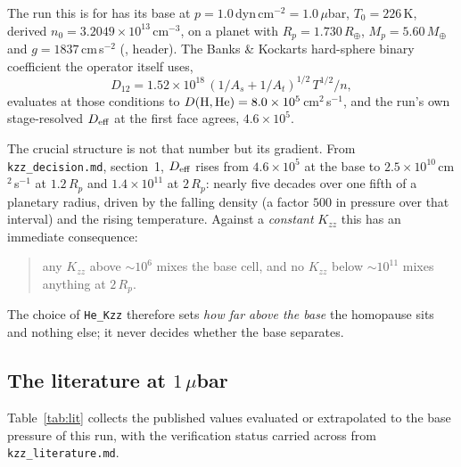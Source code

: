 \documentclass[english,a4paper]{my_memo}
\begin{document}
The run this is for has its base at $p = 1.0$\,dyn\,cm$^{-2}
= 1.0\,\mu$bar, $T_0 = 226$\,K, derived $n_0 = 3.2049\times10^{13}$\,cm$^{-3}$,
on a planet with $R_p = 1.730\,R_\oplus$, $M_p = 5.60\,M_\oplus$ and
$g = 1837$\,cm\,s$^{-2}$ (, header).
The Banks \& Kockarts hard-sphere binary coefficient the operator itself
uses,
%
\begin{equation}
  D_{12} = 1.52\times10^{18}\,(1/A_s + 1/A_t)^{1/2}\,T^{1/2}/n ,
\end{equation}
%
evaluates at those conditions to $D({\rm H,He}) =
8.0\times10^{5}$\,cm$^{2}$\,s$^{-1}$, and the run's own stage-resolved
$D_{\rm eff}$ at the first face agrees, $4.6\times10^{5}$.

The crucial structure is not that number but its gradient. From
\texttt{kzz\_decision.md}, section~1, $D_{\rm eff}$ rises from
$4.6\times10^{5}$ at the base to $2.5\times10^{10}$\,cm$^{2}$\,s$^{-1}$ at
$1.2\,R_p$ and $1.4\times10^{11}$ at $2\,R_p$: nearly five decades over
one fifth of a planetary radius, driven by the falling density (a factor
$500$ in pressure over that interval) and the rising temperature. Against a
\emph{constant} $K_{zz}$ this has an immediate consequence:
%
\begin{quote}
any $K_{zz}$ above $\sim 10^{6}$ mixes the base cell, and no $K_{zz}$ below
$\sim 10^{11}$ mixes anything at $2\,R_p$.
\end{quote}
%
The choice of \texttt{He\_Kzz} therefore sets \emph{how far above the base}
the homopause sits and nothing else; it never decides whether the base
separates.

\subsection{The literature at $1\,\mu$bar}

Table~\ref{tab:lit} collects the published values evaluated or extrapolated
to the base pressure of this run, with the verification status carried
across from \texttt{kzz\_literature.md}.
\end{document}
